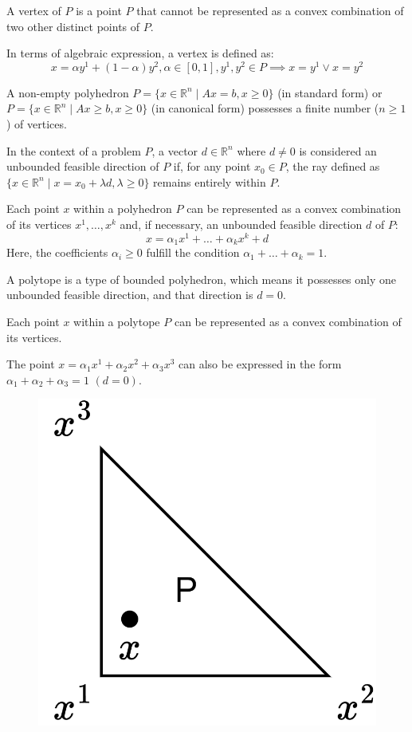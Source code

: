 \begin{definition}
    A vertex of $P$ is a point $P$ that cannot be represented as a convex combination of two other distinct points of $P$. 
\end{definition}
In terms of algebraic expression, a vertex is defined as:
\[x= \alpha y^1+(1-\alpha)y^2, \alpha \in [0,1], y^1,y^2 \in P \implies x=y^1 \lor x=y^2\]
\begin{property}
    A non-empty polyhedron $P=\{x \in \mathbb{R}^n\mid Ax=b,x \geq 0\}$ (in standard form) or $P=\{x \in \mathbb{R}^n\mid Ax\geq b,x \geq 0\}$ (in canonical form) possesses a finite number ($n \geq 1$) of vertices. 
\end{property}
\begin{definition}
    In the context of a problem $P$, a vector $d \in \mathbb{R}^n$ where $d \neq 0$ is considered an unbounded feasible direction of $P$ if, for any  point $x_0 \in P$, the ray defined as $\{x \in \mathbb{R}^n\mid x=x_0+\lambda d,\lambda \geq 0\}$ remains entirely within $P$.
\end{definition}
\begin{theorem}
    Each point $x$ within a polyhedron $P$ can be represented as a convex combination of its vertices $x^1,\dots,x^k$ and, if necessary, an unbounded feasible direction $d$ of $P$: 
    \[x=\alpha_1x^1+\dots+\alpha_kx^k+d\]
    Here, the coefficients $\alpha_i \geq 0$ fulfill the condition $\alpha_1+\dots+\alpha_k=1$. 
\end{theorem}
\begin{definition}
    A polytope is a type of bounded polyhedron, which means it possesses only one unbounded feasible direction, and that direction is $d=0$. 
\end{definition}
Each point $x$ within a polytope $P$ can be represented as a convex combination of its vertices.
\begin{example}
    The point $x=\alpha_1x^1+\alpha_2x^2+\alpha_3x^3$ can also be expressed in the form $\alpha_1+\alpha_2+\alpha_3=1$ $(d=0)$. 
    \begin{figure}[H]
        \centering
        \includegraphics[width=0.2\linewidth]{images/polytope.png}
    \end{figure}
\end{example}
